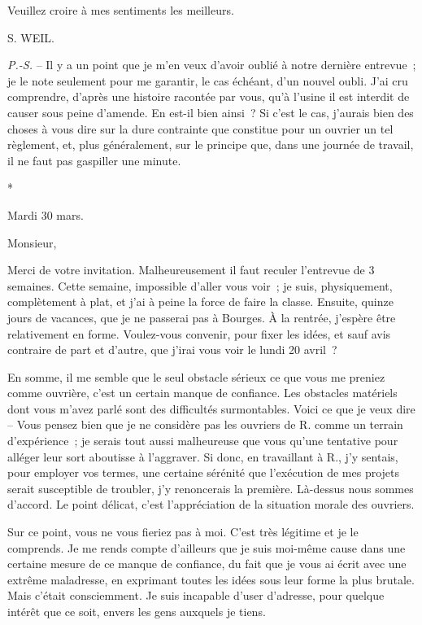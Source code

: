 \documentclass[french,twoside]{book} %
\begin{document}
Veuillez croire à mes sentiments les meilleurs.\par
S. WEIL.\par
{\itshape P.-S.} – Il y a un point que je m'en veux d'avoir oublié à notre dernière entrevue ; je le note seulement pour me garantir, le cas échéant, d'un nouvel oubli. J'ai cru comprendre, d'après une histoire racontée par vous, qu'à l'usine il est interdit de causer sous peine d'amende. En est-il bien ainsi ? Si c'est le cas, j'aurais bien des choses à vous dire sur la dure contrainte que constitue pour un ouvrier un tel règlement, et, plus généralement, sur le principe que, dans une journée de travail, il ne faut pas gaspiller une minute.\par

\begin{center}
*\end{center}
\noindent Mardi 30 mars.\par
\noindent Monsieur,\par
\par
Merci de votre invitation. Malheureusement il faut reculer l'entrevue de 3 semaines. Cette semaine, impossible d'aller vous voir ; je suis, physiquement, complètement à plat, et j'ai à peine la force de faire la classe. Ensuite, quinze jours de vacances, que je ne passerai pas à Bourges. À la rentrée, j'espère être relativement en forme. Voulez-vous convenir, pour fixer les idées, et sauf avis contraire de part et d'autre, que j'irai vous voir le lundi 20 avril ?\par
En somme, il me semble que le seul obstacle sérieux ce que vous me preniez comme ouvrière, c'est un certain manque de confiance. Les obstacles matériels dont vous m'avez parlé sont des difficultés surmontables. Voici ce que je veux dire – Vous pensez bien que je ne considère pas les ouvriers de R. comme un terrain d'expérience ; je serais tout aussi malheureuse que vous qu'une tentative pour alléger leur sort aboutisse à l'aggraver. Si donc, en travaillant à R., j'y sentais, pour employer vos termes, une certaine sérénité que l'exécution de mes projets serait susceptible de troubler, j'y renoncerais la première. Là-dessus nous sommes d'accord. Le point délicat, c'est l'appréciation de la situation morale des ouvriers.\par
Sur ce point, vous ne vous fieriez pas à moi. C'est très légitime et je le comprends. Je me rends compte d'ailleurs que je suis moi-même cause dans une certaine mesure de ce manque de confiance, du fait que je vous ai écrit avec une extrême maladresse, en exprimant toutes les idées sous leur forme la plus brutale. Mais c'était consciemment. Je suis incapable d'user d'adresse, pour quelque intérêt que ce soit, envers les gens auxquels je tiens.\par
\end{document}

